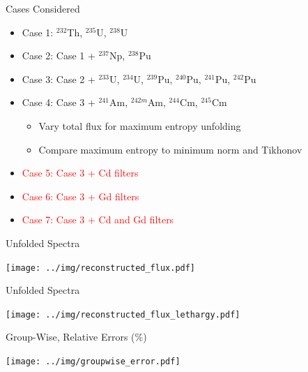 \documentclass[fleqn]{beamer}
\begin{document}
    
    
    \begin{frame}{Cases Considered}
      \begin{itemize}
      \item Case 1: ${}^{232}$Th, ${}^{235}$U, ${}^{238}$U
      \item Case 2: Case 1 + ${}^{237}$Np,  ${}^{238}$Pu
      \item Case 3: Case 2 + ${}^{233}$U, ${}^{234}$U, 
                    ${}^{239}$Pu, ${}^{240}$Pu, ${}^{241}$Pu, ${}^{242}$Pu
      \item Case 4: Case 3 +
                    ${}^{241}$Am, ${}^{242m}$Am,
                    ${}^{244}$Cm, ${}^{245}$Cm 
        \begin{itemize}
          \item Vary total flux for maximum entropy unfolding
          \item Compare maximum entropy to minimum norm and Tikhonov
        \end{itemize}
      \pause
      \item \textcolor{red}{Case 5: Case 3 + Cd filters}
      \item \textcolor{red}{Case 6: Case 3 + Gd filters}
      \item \textcolor{red}{Case 7: Case 3 + Cd and Gd filters}
      \end{itemize}
    \end{frame}
    
    \begin{frame}{Unfolded Spectra}
         \begin{center}
             \texttt{[image: ../img/reconstructed\_flux.pdf]}
         \end{center}
    \end{frame}

    \begin{frame}{Unfolded Spectra}
         \begin{center}
             \texttt{[image: ../img/reconstructed\_flux\_lethargy.pdf]}
         \end{center}
    \end{frame}
    
    \begin{frame}{Group-Wise, Relative Errors (\%)}
         \begin{center}
             \texttt{[image: ../img/groupwise\_error.pdf]}
         \end{center}
    \end{frame}
    
\end{document}
